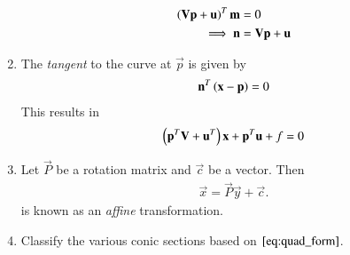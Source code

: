 \begin{enumerate}[label=\arabic*.,ref=\thesubsection.\theenumi]
\begin{align}
\left( \mathbf{V}\mathbf{p}+\mathbf{u}\right)^T\mathbf{m} & = 0 
\\
\implies \mathbf{n} &= \mathbf{V}\mathbf{p}+\mathbf{u}
\end{align}
%
\renewcommand{\theequation}{\theenumi}
\item The {\em tangent} to the curve at $\vec{p}$ is given by 
\begin{align}
\mathbf{n}^T\left(\mathbf{x}-\mathbf{p}\right) = 0
\end{align}
%
This results in
\begin{equation}
\left(\mathbf{p}^T\mathbf{V}+\mathbf{u}^T\right)\mathbf{x} + \mathbf{p}^T\mathbf{u} +f = 0
\label{eq:tangent}
\end{equation}

\item Let $\vec{P}$ be a rotation matrix and  $\vec{c}$ be a vector. Then 
\begin{align}
\vec{x} = \vec{P}\vec{y}+\vec{c}.
\label{eq:affine}
\end{align}
 is known as an {\em affine} transformation.
\item Classify the various conic sections based on $\eqref{eq:quad_form}$.
\\
\solution 
\begin{table}[!ht]
\begin{center}

\end{center}
\caption{}
\label{table:conics}
\end{table}

\end{enumerate}
